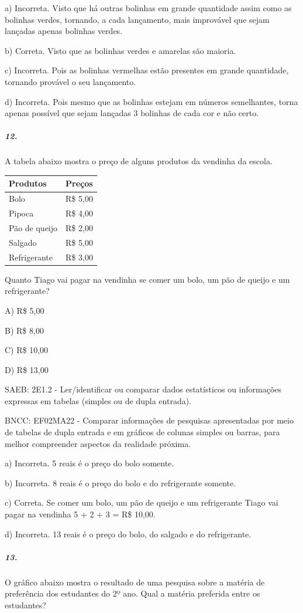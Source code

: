a) Incorreta. Visto que há outras bolinhas em grande quantidade assim
como as bolinhas verdes, tornando, a cada lançamento, mais improvável
que sejam lançadas apenas bolinhas verdes.

b) Correta. Visto que as bolinhas verdes e amarelas são maioria.

c) Incorreta. Pois as bolinhas vermelhas estão presentes em grande
quantidade, tornando provável o seu lançamento.

d) Incorreta. Pois mesmo que as bolinhas estejam em números semelhantes,
torna apenas possível que sejam lançadas 3 bolinhas de cada cor e não
certo.

\subparagraph{12. }\label{section-141}

A tabela abaixo mostra o preço de alguns produtos da vendinha da escola.

\begin{longtable}[]{@{}ll@{}}
\toprule
Produtos & Preços\tabularnewline
\midrule
\endhead
Bolo & R\$ 5,00\tabularnewline
Pipoca & R\$ 4,00\tabularnewline
Pão de queijo & R\$ 2,00\tabularnewline
Salgado & R\$ 5,00\tabularnewline
Refrigerante & R\$ 3,00\tabularnewline
\bottomrule
\end{longtable}

Quanto Tiago vai pagar na vendinha se comer um bolo, um pão de queijo e
um refrigerante?

A) R\$ 5,00

B) R\$ 8,00

C) R\$ 10,00

D) R\$ 13,00

SAEB: 2E1.2 - Ler/identificar ou comparar dados estatísticos ou
informações expressas em tabelas (simples ou de dupla entrada).

BNCC: EF02MA22 - Comparar informações de pesquisas apresentadas por meio
de tabelas de dupla entrada e em gráficos de colunas simples ou barras,
para melhor compreender aspectos da realidade próxima.

a) Incorreta. 5 reais é o preço do bolo somente.

b) Incorreta. 8 reais é o preço do bolo e do refrigerante somente.

c) Correta. Se comer um bolo, um pão de queijo e um refrigerante Tiago
vai pagar na vendinha 5 + 2 + 3 = R\$ 10,00.

d) Incorreta. 13 reais é o preço do bolo, do salgado e do refrigerante.

\subparagraph{13. }\label{section-142}

O gráfico abaixo mostra o resultado de uma pesquisa sobre a matéria de
preferência dos estudantes do 2º ano. Qual a matéria preferida entre os
estudantes?


